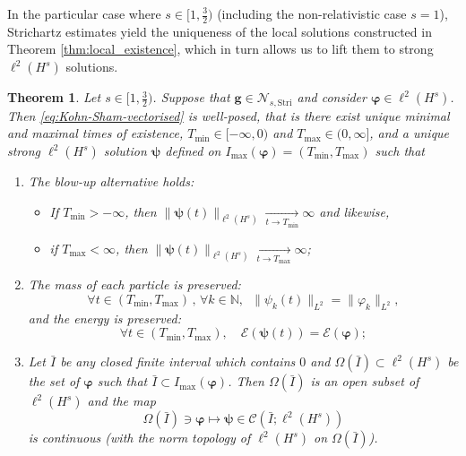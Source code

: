 \documentclass[12pt,a4paper]{amsart}
\newtheorem{theorem}{Theorem}[section]
\numberwithin{equation}{section}
\newcommand{\ulg}{\boldsymbol{g}}
\newcommand{\ulpsi}{\boldsymbol{\psi}}
\newcommand{\ulphi}{\boldsymbol{\varphi}}
\newcommand{\NStri}{\mathscr{N}_{s,\mathrm{Stri}}}
\begin{document}
	In the particular case where $s \in [1,\frac32) $ (including the non-relativistic case $s=1$), Strichartz estimates yield the uniqueness of the local solutions constructed in Theorem \ref{thm:local_existence}, which in turn allows us to lift them to strong $\ell^2(H^s)$ solutions. 
	
	\begin{theorem}\label{thm:well_posedness}
		Let $s\in[1,\frac32)$. Suppose that $\ulg\in\NStri$ and consider $ \ulphi  \in \ell^2(H^{s}) $. Then \eqref{eq:Kohn-Sham-vectorised} is well-posed, that is there exist unique minimal and maximal times of existence, $T_{\mathrm{min}}\in[-\infty,0)$ and $T_{\mathrm{max}}\in(0,\infty]$, and a unique strong $ \ell^2(H^s) $ solution $\ulpsi$ defined on 
		$ I_{\mathrm{max}}(\ulphi) = \left(T_{\mathrm{min}}, T_{\mathrm{max}} \right)$ such that
		\begin{enumerate}[label=\roman*)]
			\item The blow-up alternative holds:
			\begin{itemize}
				\item If $T_{\mathrm{min}} > -\infty $, then $  \| \ulpsi(t) \|_{\ell^2(H^s)} \xrightarrow[t \rightarrow T_{\mathrm{min}}]{} \infty$ and likewise,
				\item  if $T_{\mathrm{max}} < \infty $, then $ \| \ulpsi(t) \|_{\ell^2(H^s)} \xrightarrow[t \rightarrow T_{\mathrm{max}}]{} \infty$;
			\end{itemize}
			\item The mass of each particle is preserved:
			\begin{equation}
				\forall t \in \left(T_{\mathrm{min}}, T_{\mathrm{max}} \right)\,,\, \forall k \in \mathbb{N}, \;\  \| \psi_k(t) \|_{L^2} = \| \varphi_k \|_{L^2},
			\end{equation}
			and the energy is preserved:
			\begin{equation}
				\forall t \in \left(T_{\mathrm{min}}, T_{\mathrm{max}} \right) , \quad  \mathcal{E}(\ulpsi(t)) = \mathcal{E}(\ulphi);
			\end{equation}
			\item Let $\bar{I}$ be any closed finite interval which contains $0$ and $\Omega(\bar{I})\subset \ell^2(H^s)$ be the set of $\ulphi$ such that $\bar{I} \subset I_{\mathrm{max}}(\ulphi)$. Then $\Omega(\bar{I})$ is an open subset of $\ell^2(H^s)$ and the map 
			\begin{equation*}
				\Omega(\bar{I}) \ni \ulphi \mapsto \ulpsi \in \mathscr{C}(\bar{I};\ell^2(H^s))
			\end{equation*}
			is continuous (with the norm topology of $\ell^2(H^s)$ on $\Omega(\bar{I})$).
		\end{enumerate}
	\end{theorem}
	
\end{document}
